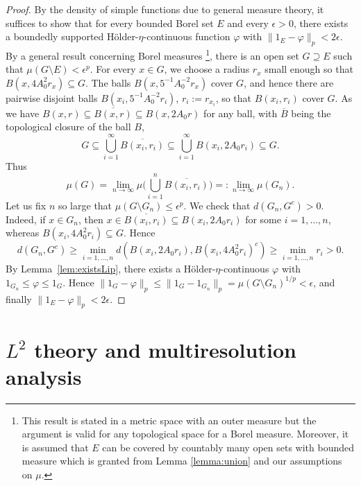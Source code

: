 \documentclass{amsart}
\numberwithin{equation}{section}
\theoremstyle{plain}
\theoremstyle{definition}
\theoremstyle{remark}
\begin{document}
{{\begin{proof}
By the density of simple functions due to general measure theory, it suffices to show that for every bounded Borel set $E$ and every $\epsilon>0$, there exists a boundedly supported H\"older-$\eta$-continuous function $\varphi$ with ${\|{1_E-\varphi}\|_{{p}}}<2\epsilon$. By a general result concerning Borel measures \cite[Theorem 2.2.2 (ii)]{Federer}\footnote{This result is stated in a metric space with an outer measure but the argument is valid for any  topological space for a Borel measure. Moreover, it is assumed that $E$ can be covered by countably many open sets with bounded measure which is granted from Lemma \ref{lemma:union} and our assumptions on $\mu$.}, there is an open set $G\supseteq E$ 
such that $\mu(G\setminus E)<\epsilon^p$. 
For every $x\in G$, we choose a radius $r_x$ small enough so that $B(x,4A_0^2 r_x)\subseteq G$. The balls $B(x,5^{-1}A_0^{-2}r_x)$ cover $G$, and hence there are pairwise disjoint balls $B(x_i,5^{-1}A_0^{-2}r_i)$, $r_{i}:=r_{x_{i}}$,  so that $B(x_{i},r_{i})$ cover $G$.  As we have $B(x,r) \subseteq \overline{B(x,r)} \subseteq B(x,2A_{0}r)$ for any ball, with $\overline B$ being the topological closure of the ball $B$,
\begin{equation*}
  G\subseteq\bigcup_{i=1}^{\infty}\overline{B(x_i,r_i)}\subseteq\bigcup_{i=1}^{\infty} B(x_i,2A_0 r_i)\subseteq G.
\end{equation*}
 Thus
 \begin{equation*}
 \mu(G)=\lim_{n\to\infty}\mu\Big(\bigcup_{i=1}^n \overline{B(x_i,r_i)}\Big)=:\lim_{n\to\infty}\mu(G_n).
\end{equation*}
Let us fix $n$ so large that $\mu(G\setminus G_n)\leq\epsilon^p$. We check that $d(G_n,G^c)>0$. Indeed, if $x\in G_n$, then $x\in\overline{B(x_i, r_i)}\subseteq B(x_i,2A_0 r_i)$ for some $i=1,\ldots,n$, whereas $B(x_i,4A_0^2r_i)\subseteq G$. Hence
\begin{equation*}
  d(G_n,G^c)\geq\min_{i=1,\ldots,n} d(B(x_i,2A_0r_i),B(x_i,4A_0^2 r_i)^c)\geq\min_{i=1,\ldots,n} { r_i}>0.
\end{equation*}
By Lemma~\ref{lem:existsLip}, there exists a H\"older-$\eta$-continuous $\varphi$ with $1_{G_n}\leq\varphi\leq 1_G$. Hence ${\|{1_G-\varphi}\|_{{p}}}\leq{\|{1_G-1_{G_n}}\|_{{p}}}=\mu(G\setminus G_n)^{1/p}<\epsilon$, and finally $\|1_{E}-\varphi\|_{p}<2\epsilon$.
\end{proof}

\section{$L^2$ theory and multiresolution analysis}\label{sec:l2}

}}
\end{document}
